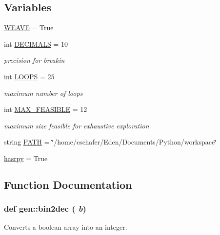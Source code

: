 \subsection*{Variables}
\begin{CompactItemize}
\item 
\hyperlink{namespacegen_448acbda618185ee4482080762551d0c}{WEAVE} = True
\item 
int \hyperlink{namespacegen_283eb6a0f532506a7be95ca53d71ef06}{DECIMALS} = 10
\begin{CompactList}\small\item\em precision for breakin \item\end{CompactList}\item 
int \hyperlink{namespacegen_257a6a4ead271854ce0abaee1e27ce1d}{LOOPS} = 25
\begin{CompactList}\small\item\em maximum number of loops \item\end{CompactList}\item 
int \hyperlink{namespacegen_d75234477e080aeb312e8cb2813d5ba6}{MAX\_\-FEASIBLE} = 12
\begin{CompactList}\small\item\em maximum size feasible for exhaustive exploration \item\end{CompactList}\item 
string \hyperlink{namespacegen_cd9fd05ba9face577992611e21fd84ca}{PATH} = \char`\"{}/home/cschafer/Eden/Documents/Python/workspace\char`\"{}
\item 
\hyperlink{namespacegen_362c029b7eeb5fb3c67104ac5a218849}{hasrpy} = True
\end{CompactItemize}


\subsection{Function Documentation}
\hypertarget{namespacegen_6b7ade8b5daf3fe3773bbd616e9e2b42}{
\subsubsection[{bin2dec}]{\setlength{\rightskip}{0pt plus 5cm}def gen::bin2dec ( {\em b})}}
\label{namespacegen_6b7ade8b5daf3fe3773bbd616e9e2b42}


Converts a boolean array into an integer. 

